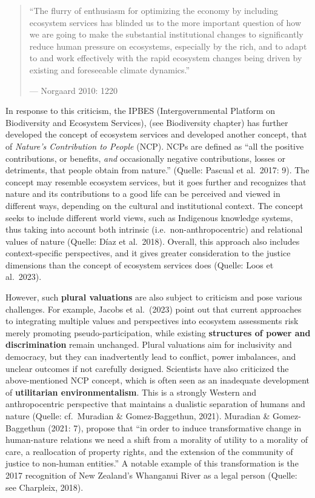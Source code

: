 \documentclass[
  a4paper,
  openany]{book}
\begin{document}
\begin{quote}
``The flurry of enthusiasm for optimizing the economy by including
ecosystem services has blinded us to the more important question of how
we are going to make the substantial institutional changes to
significantly reduce human pressure on ecosystems, especially by the
rich, and to adapt to and work effectively with the rapid ecosystem
changes being driven by existing and foreseeable climate dynamics.''

--- Norgaard 2010: 1220
\end{quote}

In response to this criticism, the IPBES (Intergovernmental Platform on
Biodiversity and Ecosystem Services), (see Biodiversity chapter) has
further developed the concept of ecosystem services and developed
another concept, that of \emph{Nature's Contribution to People} (NCP).
NCPs are defined as ``all the positive contributions, or benefits,
\emph{and} occasionally negative contributions, losses or detriments,
that people obtain from nature.'' (Quelle: Pascual et al.~2017: 9). The
concept may resemble ecosystem services, but it goes further and
recognizes that nature and its contributions to a good life can be
perceived and viewed in different ways, depending on the cultural and
institutional context. The concept seeks to include different world
views, such as Indigenous knowledge systems, thus taking into account
both intrinsic (i.e.~non-anthropocentric) and relational values of
nature (Quelle: Díaz et al.~2018). Overall, this approach also includes
context-specific perspectives, and it gives greater consideration to the
justice dimensions than the concept of ecosystem services does (Quelle:
Loos et al.~2023).

However, such \textbf{plural valuations} are also subject to criticism
and pose various challenges. For example, Jacobs et al.~(2023) point out
that current approaches to integrating multiple values and perspectives
into ecosystem assessments risk merely promoting pseudo-participation,
while existing \textbf{structures of power and discrimination} remain
unchanged. Plural valuations aim for inclusivity and democracy, but they
can inadvertently lead to conflict, power imbalances, and unclear
outcomes if not carefully designed. Scientists have also criticized the
above-mentioned NCP concept, which is often seen as an inadequate
development of \textbf{utilitarian environmentalism}. This is a strongly
Western and anthropocentric perspective that maintains a dualistic
separation of humans and nature (Quelle: cf.~Muradian \&
Gomez-Baggethun, 2021). Muradian \& Gomez-Baggethun (2021: 7), propose
that ``in order to induce transformative change in human-nature
relations we need a shift from a morality of utility to a morality of
care, a reallocation of property rights, and the extension of the
community of justice to non-human entities.'' A notable example of this
transformation is the 2017 recognition of New Zealand's Whanganui River
as a legal person (Quelle: see Charpleix, 2018).
\end{document}
